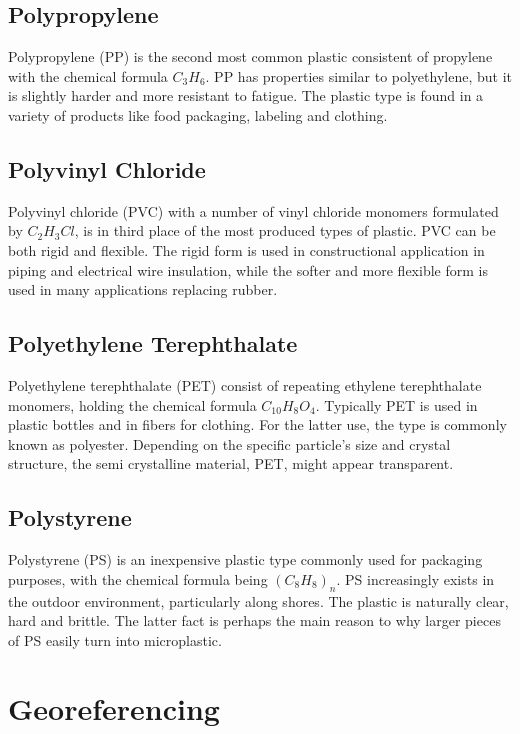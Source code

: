 \subsection{Polypropylene}
Polypropylene (PP) is the second most common plastic consistent of propylene with the chemical formula $C_3H_6$. PP has properties similar to polyethylene, but it is slightly harder and more resistant to fatigue. The plastic type is found in a variety of products like food packaging, labeling and clothing. 

\subsection{Polyvinyl Chloride}
Polyvinyl chloride (PVC) with a number of vinyl chloride monomers formulated by $C_2H_3Cl$, is in third place of the most produced types of plastic. PVC can be both rigid and flexible. The rigid form is used in constructional application in piping and electrical wire insulation, while the softer and more flexible form is used in many applications replacing rubber. 

\subsection{Polyethylene Terephthalate}
Polyethylene terephthalate (PET) consist of repeating ethylene terephthalate monomers, holding the chemical formula $C_{10}H_8O_4$. Typically PET is used in plastic bottles and in fibers for clothing. For the latter use, the type is commonly known as polyester. Depending on the specific particle's size and crystal structure, the semi crystalline material, PET, might appear transparent. 

\subsection{Polystyrene}
Polystyrene (PS) is an inexpensive plastic type commonly used for packaging purposes, with the chemical formula being $(C_8H_8)_n$. PS increasingly exists in the outdoor environment, particularly along shores. The plastic is naturally clear, hard and brittle. The latter fact is perhaps the main reason to why larger pieces of PS easily turn into microplastic. 

\section{Georeferencing}

